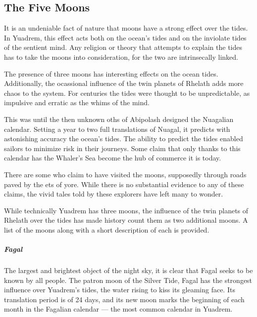 \subsection*{The Five Moons}


It is an undeniable fact of nature that moons have a strong effect over the tides.
In Yuadrem, this effect acts both on the ocean's tides and on the inviolate tides of the sentient mind.
Any religion or theory that attempts to explain the tides has to take the moons into consideration, for the two are intrinsecally linked.

The presence of three moons has interesting effects on the ocean tides.
Additionally, the ocassional influence of the twin planets of Rhelath adds more chaos to the system.
For centuries the tides were thought to be unpredictable, as impulsive and erratic as the whims of the mind.

This was until the then unknown oths of Abipolash designed the Nuagalian calendar.
Setting a year to two full translations of Nuagal, it predicts with astonishing accuracy the ocean's tides.
The ability to predict the tides enabled sailors to minimize risk in their journeys.
Some claim that only thanks to this calendar has the Whaler's Sea become the hub of commerce it is today.

There are some who claim to have visited the moons, supposedly through roads paved by the ets of yore.
While there is no substantial evidence to any of these claims, the vivid tales told by these explorers have left many to wonder.

While technically Yuadrem has three moons, the influence of the twin planets of Rhelath over the tides has made history count them as two additional moons.
A list of the moons along with a short description of each is provided.

\subparagraph{Fagal} The largest and brightest object of the night sky, it is clear that Fagal seeks to be known by all people.
The patron moon of the Silver Tide, Fagal has the strongest influence over Yuadrem's tides, the water rising to kiss its gleaming face.
Its translation period is of 24 days, and its new moon marks the beginning of each month in the Fagalian calendar --- the most common calendar in Yuadrem.

